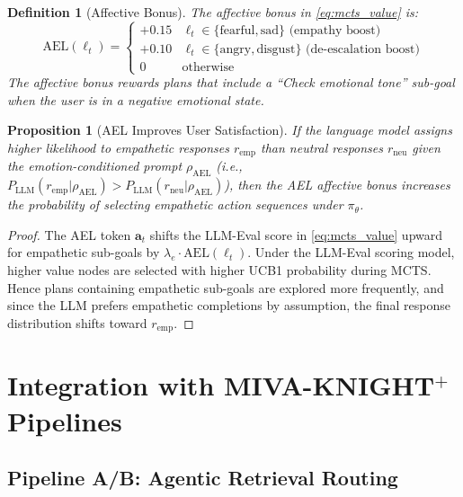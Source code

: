 \documentclass[10pt,conference]{IEEEtran}
\theoremstyle{ieeethm}
\newtheorem{proposition}[theorem]{Proposition}
\theoremstyle{ieeedef}
\newtheorem{definition}[theorem]{Definition}
\theoremstyle{ieeeremark}
\begin{document}
\begin{definition}[Affective Bonus]
\label{def:affective_bonus}
The affective bonus in \eqref{eq:mcts_value} is:
\begin{equation}
\text{AEL}(\ell_t) = \begin{cases}
+0.15 & \ell_t \in \{\text{fearful}, \text{sad}\} \text{ (empathy boost)} \\
+0.10 & \ell_t \in \{\text{angry}, \text{disgust}\} \text{ (de-escalation boost)} \\
0     & \text{otherwise}
\end{cases}
\label{eq:affective_bonus}
\end{equation}
The affective bonus rewards plans that include a ``Check emotional tone'' sub-goal when the user is in a negative emotional state.
\end{definition}

\begin{proposition}[AEL Improves User Satisfaction]
\label{prop:ael_satisfaction}
If the language model assigns higher likelihood to empathetic responses $r_\text{emp}$ than neutral responses $r_\text{neu}$ given the emotion-conditioned prompt $\rho_\text{AEL}$ (i.e., $P_\text{LLM}(r_\text{emp}|\rho_\text{AEL}) > P_\text{LLM}(r_\text{neu}|\rho_\text{AEL})$), then the AEL affective bonus increases the probability of selecting empathetic action sequences under $\pi_\theta$.
\end{proposition}
\begin{proof}
The AEL token $\mathbf{a}_t$ shifts the LLM-Eval score in \eqref{eq:mcts_value} upward for empathetic sub-goals by $\lambda_e \cdot \text{AEL}(\ell_t)$. Under the LLM-Eval scoring model, higher value nodes are selected with higher UCB1 probability during MCTS. Hence plans containing empathetic sub-goals are explored more frequently, and since the LLM prefers empathetic completions by assumption, the final response distribution shifts toward $r_\text{emp}$.
\end{proof}

\section{Integration with MIVA-KNIGHT$^+$ Pipelines}
\label{sec:integration}

\subsection{Pipeline A/B: Agentic Retrieval Routing}
\end{document}
